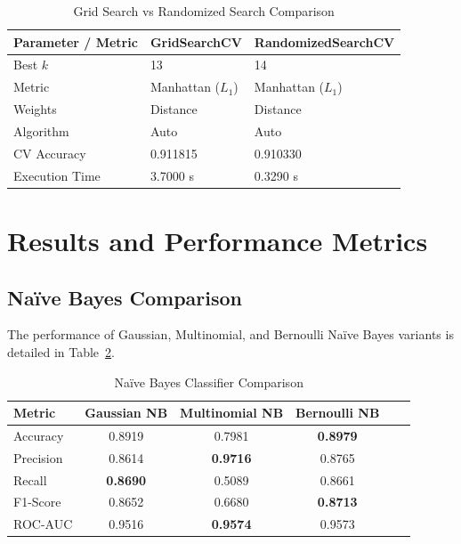 \documentclass[12pt,a4paper]{article}
\begin{document}
\begin{table}[H]
\centering
\caption{Grid Search vs Randomized Search Comparison} \label{tab:grid_vs_random}
\vspace{0.2cm}
\begin{tabular}{lll}
\toprule
\textbf{Parameter / Metric} & \textbf{GridSearchCV} & \textbf{RandomizedSearchCV} \\
\midrule
Best $k$ & 13 & 14 \\
Metric & Manhattan ($L_1$) & Manhattan ($L_1$) \\
Weights & Distance & Distance \\
Algorithm & Auto & Auto \\
CV Accuracy & 0.911815 & 0.910330 \\
Execution Time & 3.7000 s & 0.3290 s \\
\bottomrule
\end{tabular}
\end{table}

\section{Results and Performance Metrics}

\subsection{Na\"ive Bayes Comparison}
The performance of Gaussian, Multinomial, and Bernoulli Na\"ive Bayes variants is detailed in Table~\ref{tab:nb_comp}.

\begin{table}[H]
\centering
\caption{Na\"ive Bayes Classifier Comparison} \label{tab:nb_comp}
\vspace{0.2cm}
\begin{tabular}{lccccc}
\toprule
\textbf{Metric} & \textbf{Gaussian NB} & \textbf{Multinomial NB} & \textbf{Bernoulli NB} \\
\midrule
Accuracy & 0.8919 & 0.7981 & \textbf{0.8979} \\
Precision & 0.8614 & \textbf{0.9716} & 0.8765 \\
Recall & \textbf{0.8690} & 0.5089 & 0.8661 \\
F1-Score & 0.8652 & 0.6680 & \textbf{0.8713} \\
ROC-AUC & 0.9516 & \textbf{0.9574} & 0.9573 \\
\bottomrule
\end{tabular}
\end{table}
\end{document}
